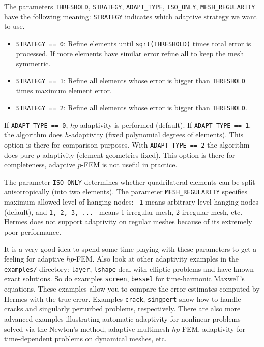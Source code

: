 \documentclass[11pt]{article}
\begin{document}
The parameters {\tt THRESHOLD}, {\tt STRATEGY}, {\tt ADAPT\_TYPE}, {\tt ISO\_ONLY}, {\tt MESH\_REGULARI\break TY}
have the following meaning: {\tt STRATEGY} indicates which adaptive strategy we
want to use.
\begin{itemize}
\vskip -5mm
\item {\tt STRATEGY == 0}: Refine elements until {\tt sqrt(THRESHOLD)} times total error
is processed. If more elements have similar error refine all to keep the mesh symmetric.
\item {\tt STRATEGY == 1}: Refine all elements whose error is bigger than {\tt THRESHOLD}
times maximum element error.
\item {\tt STRATEGY == 2}: Refine all elements whose error is bigger than {\tt THRESHOLD}.
\end{itemize}

If {\tt ADAPT\_TYPE == 0}, $hp$-adaptivity is performed (default). If {\tt ADAPT\_TYPE == 1},
the algorithm does $h$-adaptivity (fixed polynomial degrees of elements). This option is there
for comparison purposes. With {\tt ADAPT\_TYPE == 2} the algorithm does pure $p$-adaptivity (element
geometries fixed). This option
is there for completeness, adaptive $p$-FEM is not useful in practice.

The parameter {\tt ISO\_ONLY} determines whether quadrilateral elements
can be split anisotropically (into two elements). The parameter {\tt MESH\_REGULA\break RITY}
specifies maximum allowed level of hanging nodes: {\tt -1} means arbitrary-level
hanging nodes (default), and {\tt 1, 2, 3, ... } means 1-irregular mesh,
2-irregular mesh, etc. Hermes does not support adaptivity on regular meshes
because of its extremely poor performance.

It is a very good idea to spend some time playing with these parameters to
get a feeling for adaptive $hp$-FEM. Also look at other adaptivity examples in
the {\tt examples/} directory: {\tt layer}, {\tt lshape} deal with elliptic problems and have
known exact solutions. So do examples {\tt screen}, {\tt bessel} for time-harmonic
Maxwell's equations. These examples allow you to compare the error estimates
computed by Hermes with the true error. Examples {\tt crack}, {\tt singpert} show
how to handle cracks and singularly perturbed problems, respectively. There
are also more advanced examples illustrating automatic adaptivity for nonlinear
problems solved via the Newton's method, adaptive multimesh \hbox{$hp$-FEM},
adaptivity for time-dependent problems on dynamical meshes, etc.
\end{document}
